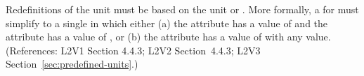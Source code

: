 Redefinitions of the  unit  must be based on the unit
 or .  More formally, a \UnitDefinition
for  must simplify to a single \Unit in which either (a) the
 attribute has a value of  and the
 attribute has a value of , or (b) the
 attribute has a value of  with
any  value.  (References: L2V1 Section 4.4.3; L2V2
Section~4.4.3; L2V3 Section~\ref{sec:predefined-units}.)
